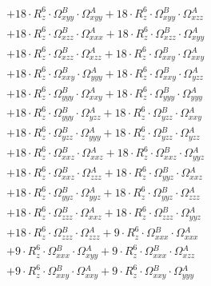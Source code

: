 \documentclass{article}
\begin{document}
\begin{subequations}
\begin{gather}
\begin{array}{c}
 \\[0.2em] 		 + 18 \cdot R_{z}^{6} \cdot \Omega{}^{B}_{xyy} \cdot \Omega{}^{A}_{xyy}+ 18 \cdot R_{z}^{6} \cdot \Omega{}^{B}_{xyy} \cdot \Omega{}^{A}_{xzz} 
 \\[0.2em] 		 + 18 \cdot R_{z}^{6} \cdot \Omega{}^{B}_{xzz} \cdot \Omega{}^{A}_{xxx}+ 18 \cdot R_{z}^{6} \cdot \Omega{}^{B}_{xzz} \cdot \Omega{}^{A}_{xyy} 
 \\[0.2em] 		 + 18 \cdot R_{z}^{6} \cdot \Omega{}^{B}_{xzz} \cdot \Omega{}^{A}_{xzz}+ 18 \cdot R_{z}^{6} \cdot \Omega{}^{B}_{xxy} \cdot \Omega{}^{A}_{xxy} 
 \\[0.2em] 		 + 18 \cdot R_{z}^{6} \cdot \Omega{}^{B}_{xxy} \cdot \Omega{}^{A}_{yyy}+ 18 \cdot R_{z}^{6} \cdot \Omega{}^{B}_{xxy} \cdot \Omega{}^{A}_{yzz} 
 \\[0.2em] 		 + 18 \cdot R_{z}^{6} \cdot \Omega{}^{B}_{yyy} \cdot \Omega{}^{A}_{xxy}+ 18 \cdot R_{z}^{6} \cdot \Omega{}^{B}_{yyy} \cdot \Omega{}^{A}_{yyy} 
 \\[0.2em] 		 + 18 \cdot R_{z}^{6} \cdot \Omega{}^{B}_{yyy} \cdot \Omega{}^{A}_{yzz}+ 18 \cdot R_{z}^{6} \cdot \Omega{}^{B}_{yzz} \cdot \Omega{}^{A}_{xxy} 
 \\[0.2em] 		 + 18 \cdot R_{z}^{6} \cdot \Omega{}^{B}_{yzz} \cdot \Omega{}^{A}_{yyy}+ 18 \cdot R_{z}^{6} \cdot \Omega{}^{B}_{yzz} \cdot \Omega{}^{A}_{yzz} 
 \\[0.2em] 		 + 18 \cdot R_{z}^{6} \cdot \Omega{}^{B}_{xxz} \cdot \Omega{}^{A}_{xxz}+ 18 \cdot R_{z}^{6} \cdot \Omega{}^{B}_{xxz} \cdot \Omega{}^{A}_{yyz} 
 \\[0.2em] 		 + 18 \cdot R_{z}^{6} \cdot \Omega{}^{B}_{xxz} \cdot \Omega{}^{A}_{zzz}+ 18 \cdot R_{z}^{6} \cdot \Omega{}^{B}_{yyz} \cdot \Omega{}^{A}_{xxz} 
 \\[0.2em] 		 + 18 \cdot R_{z}^{6} \cdot \Omega{}^{B}_{yyz} \cdot \Omega{}^{A}_{yyz}+ 18 \cdot R_{z}^{6} \cdot \Omega{}^{B}_{yyz} \cdot \Omega{}^{A}_{zzz} 
 \\[0.2em] 		 + 18 \cdot R_{z}^{6} \cdot \Omega{}^{B}_{zzz} \cdot \Omega{}^{A}_{xxz}+ 18 \cdot R_{z}^{6} \cdot \Omega{}^{B}_{zzz} \cdot \Omega{}^{A}_{yyz} 
 \\[0.2em] 		 + 18 \cdot R_{z}^{6} \cdot \Omega{}^{B}_{zzz} \cdot \Omega{}^{A}_{zzz}+ 9 \cdot R_{z}^{6} \cdot \Omega{}^{B}_{xxx} \cdot \Omega{}^{A}_{xxx} 
 \\[0.2em] 		 + 9 \cdot R_{z}^{6} \cdot \Omega{}^{B}_{xxx} \cdot \Omega{}^{A}_{xyy}+ 9 \cdot R_{z}^{6} \cdot \Omega{}^{B}_{xxx} \cdot \Omega{}^{A}_{xzz} 
 \\[0.2em] 		 + 9 \cdot R_{z}^{6} \cdot \Omega{}^{B}_{xxy} \cdot \Omega{}^{A}_{xxy}+ 9 \cdot R_{z}^{6} \cdot \Omega{}^{B}_{xxy} \cdot \Omega{}^{A}_{yyy} 

\end{array}
\end{gather}
\end{subequations}
\end{document}
